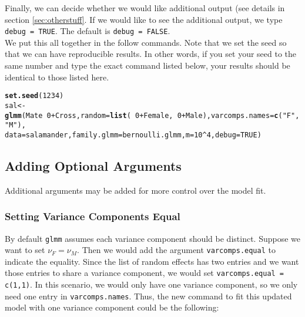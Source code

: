\documentclass[11pt]{article}\usepackage[]{graphicx}\usepackage[]{color}
\makeatletter
\newcommand{\hlnum}[1]{\textcolor[rgb]{0.686,0.059,0.569}{#1}}%
\newcommand{\hlstr}[1]{\textcolor[rgb]{0.192,0.494,0.8}{#1}}%
\newcommand{\hlopt}[1]{\textcolor[rgb]{0,0,0}{#1}}%
\newcommand{\hlstd}[1]{\textcolor[rgb]{0.345,0.345,0.345}{#1}}%
\newcommand{\hlkwb}[1]{\textcolor[rgb]{0.69,0.353,0.396}{#1}}%
\newcommand{\hlkwc}[1]{\textcolor[rgb]{0.333,0.667,0.333}{#1}}%
\newcommand{\hlkwd}[1]{\textcolor[rgb]{0.737,0.353,0.396}{\textbf{#1}}}%
\newenvironment{kframe}{%
 \def\at@end@of@kframe{}%
 \ifinner\ifhmode%
  \def\at@end@of@kframe{\end{minipage}}%
  \begin{minipage}{\columnwidth}%
 \fi\fi%
 \def\FrameCommand##1{\hskip\@totalleftmargin \hskip-\fboxsep
 \colorbox{shadecolor}{##1}\hskip-\fboxsep
     \hskip-\linewidth \hskip-\@totalleftmargin \hskip\columnwidth}%
 \MakeFramed {\advance\hsize-\width
   \@totalleftmargin\z@ \linewidth\hsize
   \@setminipage}}%
 {\par\unskip\endMakeFramed%
 \at@end@of@kframe}
\newenvironment{knitrout}{}{} %
\makeatother
\begin{document}
Finally, we can decide whether we would like additional output (see details in section \ref{sec:otherstuff}. If we would like to see the additional output, we type \texttt{debug = TRUE}. The default is \texttt{debug = FALSE}.\\

We put this all together in the follow commands. Note that we set the seed so that we can have reproducible results. In other words, if you set your seed to the same number and type the exact command listed below, your results should be identical to those listed here.\\

\begin{knitrout}
\color{fgcolor}\begin{kframe}
\begin{alltt}
\hlkwd{set.seed}\hlstd{(}\hlnum{1234}\hlstd{)}
\hlstd{sal}\hlkwb{<-}\hlkwd{glmm}\hlstd{(Mate}\hlopt{~}\hlnum{0}\hlopt{+}\hlstd{Cross,}\hlkwc{random}\hlstd{=}\hlkwd{list}\hlstd{(}\hlopt{~}\hlnum{0}\hlopt{+}\hlstd{Female,}\hlopt{~}\hlnum{0}\hlopt{+}\hlstd{Male),}\hlkwc{varcomps.names}\hlstd{=}\hlkwd{c}\hlstd{(}\hlstr{"F"}\hlstd{,}\hlstr{"M"}\hlstd{),}
\hlkwc{data}\hlstd{=salamander,}\hlkwc{family.glmm}\hlstd{=bernoulli.glmm,}\hlkwc{m}\hlstd{=}\hlnum{10}\hlopt{^}\hlnum{4}\hlstd{,}\hlkwc{debug}\hlstd{=}\hlnum{TRUE}\hlstd{)}
\end{alltt}
\end{kframe}
\end{knitrout}

\subsection{Adding Optional Arguments}
Additional arguments may be added for more control over the model fit.\\
\subsubsection{Setting Variance Components Equal}
By default \texttt{glmm} assumes each variance component should be distinct. Suppose we want to set $\nu_F = \nu_M.$ Then we would add the argument \texttt{varcomps.equal} to indicate the equality. Since the list of random effects has two entries and we want those entries to share a variance component, we would set \texttt{varcomps.equal = c(1,1)}. In this scenario, we would only have one variance component, so we only need one entry in \texttt{varcomps.names}. Thus, the new command to fit this updated model with one variance component could be the following: \\
\end{document}
